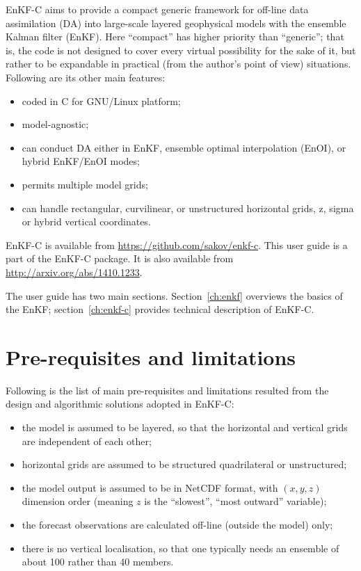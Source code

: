 \documentclass[11pt]{report}
\begin{document}
EnKF-C aims to provide a compact generic framework for off-line data assimilation (DA) into large-scale layered geophysical models with the ensemble Kalman filter (EnKF).
Here ``compact'' has higher priority than ``generic''; that is, the code is not designed to cover every virtual possibility for the sake of it, but rather to be expandable in practical (from the author's point of view) situations.
Following are its other main features:
\begin{itemize}
\item coded in C for GNU/Linux platform;
\item model-agnostic;
\item can conduct DA either in EnKF, ensemble optimal interpolation (EnOI), or hybrid EnKF/EnOI modes;
\item permits multiple model grids;
\item can handle rectangular, curvilinear, or unstructured horizontal grids, z, sigma or hybrid vertical coordinates.
\end{itemize}

EnKF-C is available from \url{https://github.com/sakov/enkf-c}.
This user guide is a part of the EnKF-C package. 
It is also available from \url{http://arxiv.org/abs/1410.1233}.

The user guide has two main sections.
Section~\ref{ch:enkf} overviews the basics of the EnKF; section~\ref{ch:enkf-c} provides technical description of EnKF-C.

\section*{Pre-requisites and limitations}

Following is the list of main pre-requisites and limitations resulted from the design and algorithmic solutions adopted in EnKF-C:
\begin{itemize}
\item the model is assumed to be layered, so that the horizontal and vertical grids are independent of each other;
\item horizontal grids are assumed to be structured quadrilateral or unstructured;
\item the model output is assumed to be in NetCDF format, with $(x, y, z)$ dimension order (meaning $z$ is the ``slowest'', ``most outward'' variable);
\item the forecast observations are calculated off-line (outside the model) only;
\item there is no vertical localisation, so that one typically needs an ensemble of about 100 rather than 40 members.
\end{itemize}
\end{document}
